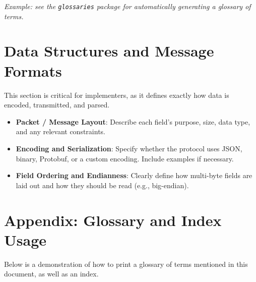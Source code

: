 \documentclass[12pt,a4paper]{article}
\begin{document}
\textit{Example: see the \texttt{glossaries} package for automatically 
generating a glossary of terms.}


\section{Data Structures and Message Formats}
This section is critical for implementers, as it defines exactly how data 
is encoded, transmitted, and parsed.
\begin{itemize}[noitemsep]
  \item \textbf{Packet / Message Layout}: Describe each field’s purpose, 
  size, data type, and any relevant constraints.
  \item \textbf{Encoding and Serialization}: Specify whether the protocol 
  uses JSON, binary, Protobuf, or a custom encoding. Include examples if 
  necessary.
  \item \textbf{Field Ordering and Endianness}: Clearly define how multi-byte 
  fields are laid out and how they should be read (e.g., big-endian).
\end{itemize}
\appendix

\section{Appendix: Glossary and Index Usage}
Below is a demonstration of how to print a glossary of terms mentioned in 
this document, as well as an index.

\clearpage
\printglossary[title=Glossary of Terms]

\clearpage
\printindex
\end{document}
